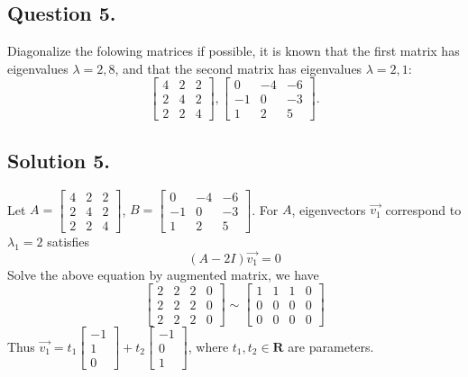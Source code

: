 \documentclass{article}
\begin{document}
\subsection*{Question 5.}
Diagonalize the folowing matrices if possible, it is known that the first matrix has eigenvalues $\lambda=2,8$, and that the second matrix has eigenvalues $\lambda=2,1$:
\[\left[\begin{array}{rrr}
4 & 2 & 2 \\
2 & 4 & 2 \\
2 & 2 & 4
\end{array}\right],\left[\begin{array}{rrr}
0 & -4 & -6 \\
-1 & 0 & -3 \\
1 & 2 & 5
\end{array}\right].\]
\subsection*{Solution 5.}
Let $A=\left[\begin{array}{rrr}
4 & 2 & 2 \\
2 & 4 & 2 \\
2 & 2 & 4
\end{array}\right]$, $B=\left[\begin{array}{rrr}
0 & -4 & -6 \\
-1 & 0 & -3 \\
1 & 2 & 5
\end{array}\right]$.\newline
For $A$, \newline
eigenvectors $\Vec{v_1}$ correspond to $\lambda_1=2$ satisfies
\[(A-2I)\Vec{v_1}=0\]
Solve the above equation by augmented matrix, we have
\[\left[\begin{array}{rrrr}
2 & 2 & 2 & 0 \\
2 & 2 & 2 & 0 \\
2 & 2 & 2 & 0
\end{array}\right]\sim \left[\begin{array}{rrrr}
1 & 1 & 1 & 0 \\
0 & 0 & 0 & 0 \\
0 & 0 & 0 & 0
\end{array}\right]\]
Thus $\Vec{v_1}=t_1\left[\begin{array}{r}-1\\1\\0\end{array}\right]+t_2\left[\begin{array}{r}-1\\0\\1\end{array}\right]$, where $t_1,t_2\in \mathbf{R}$ are parameters.\newline
\end{document}
